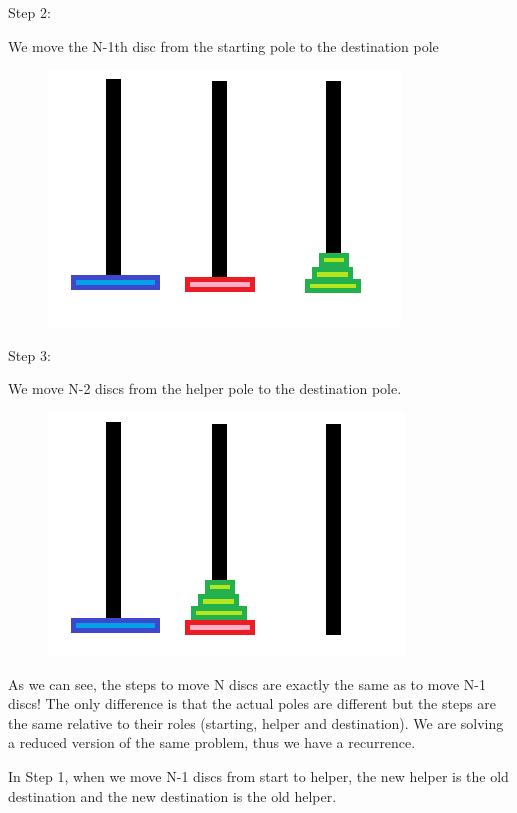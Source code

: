 \documentclass[11pt,oneside]{book}
\makeatletter
\def\maxwidth#1{\ifdim\Gin@nat@width>#1 #1\else\Gin@nat@width\fi}
\makeatother
\begin{document}
Step 2:

We move the N-1th disc from the starting pole to the destination pole

\vspace{5px}\begin{figure}[H]\centering
        \includegraphics[width=0.66\maxwidth{\textwidth}]{hanoi6.png}
        \end{figure}

Step 3:

We move N-2 discs from the helper pole to the destination pole.

\vspace{5px}\begin{figure}[H]\centering
        \includegraphics[width=0.66\maxwidth{\textwidth}]{hanoi2.png}
        \end{figure}

As we can see, the steps to move N discs are exactly the same as to move N-1 discs! The only difference is that the actual poles are different but the steps are the same relative to their roles (starting, helper and destination). We are solving a reduced version of the same problem, thus we have a recurrence.

In Step 1, when we move N-1 discs from start to helper, the new helper is the old destination and the new destination is the old helper.
\end{document}
